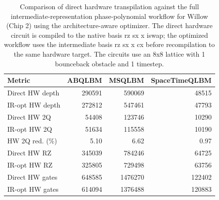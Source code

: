 \begin{table}[ht]
\centering
\begin{tabular}{lrrr}
\hline
Metric & ABQLBM & MSQLBM & SpaceTimeQLBM \\
\hline
Direct HW depth & 290591 & 590069 & 48515 \\
IR-opt HW depth & 272812 & 547461 & 47793 \\
Direct HW 2Q & 54408 & 123746 & 10290 \\
IR-opt HW 2Q & 51634 & 115558 & 10190 \\
HW 2Q red. (\%) & 5.10 & 6.62 & 0.97 \\
Direct HW RZ & 345039 & 784246 & 64725 \\
IR-opt HW RZ & 325805 & 729498 & 63756 \\
Direct HW gates & 648585 & 1476270 & 122402 \\
IR-opt HW gates & 614094 & 1376488 & 120883 \\
\hline
\end{tabular}
\caption{Comparison of direct hardware transpilation against the full intermediate-representation phase-polynomial workflow for Willow (Chip 2) using the architecture-aware optimizer. The direct hardware circuit is compiled to the native basis rz sx x iswap; the optimized workflow uses the intermediate basis rz sx x cx before recompilation to the same hardware target. The circuits use an 8x8 lattice with 1 bounceback obstacle and 1 timestep.}
\label{tab:phase-poly-ir-flow-comparison-8x8-obs1-t1-google-willow-2024-architecture-aware}
\end{table}
